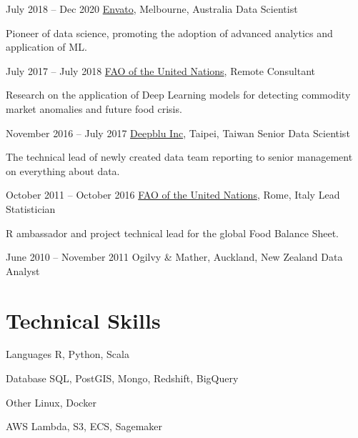 \documentclass{tccv}
\begin{document}
\begin{eventlist}

\item{July 2018 -- Dec 2020}
  {\href{https://envato.com/}{Envato}, Melbourne, Australia}
  {Data Scientist}

  Pioneer of data science, promoting the adoption of advanced
  analytics and application of ML.

\item{July 2017 -- July 2018}
  {\href{http://www.fao.org/home/en/}{FAO of the United Nations}, Remote}
  {Consultant}

  Research on the application of Deep Learning models for detecting
  commodity market anomalies and future food crisis.
  
\item{November 2016 -- July 2017}
  {\href{http://deepblu.com/}{Deepblu Inc}, Taipei, Taiwan}
  {Senior Data Scientist}

  The technical lead of newly created data team reporting to senior
  management on everything about data.

\item{October 2011 -- October 2016}
  {\href{http://www.fao.org/home/en/}{FAO of the United Nations}, Rome, Italy}
  {Lead Statistician}

  R ambassador and project technical lead for the global Food Balance Sheet.\\
  
\item{June 2010 -- November 2011}
  {Ogilvy \& Mather, Auckland, New Zealand}
  {Data Analyst}


\end{eventlist}



\section{Technical Skills}
\begin{factlist}
\item{Languages}
  {R, Python, Scala}
\item{Database}
  {SQL, PostGIS, Mongo, Redshift, BigQuery}
\item{Other}
  {Linux, Docker}
\item{AWS}
  {Lambda, S3, ECS, Sagemaker}
\end{factlist}
\end{document}
